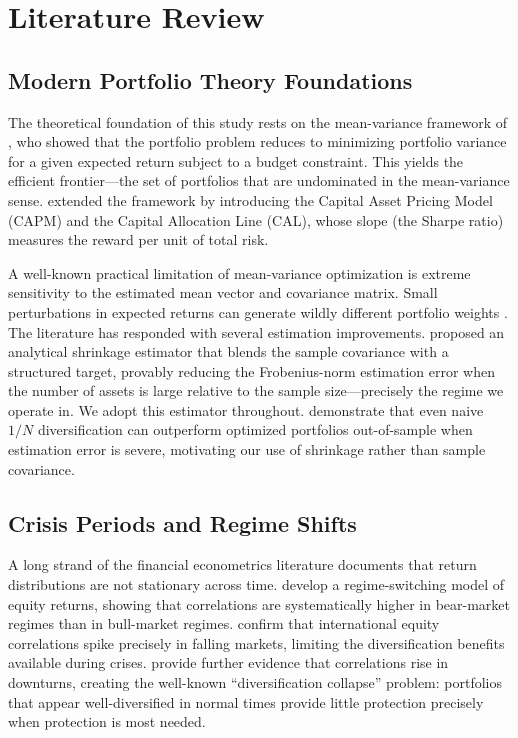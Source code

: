 \documentclass[12pt,a4paper]{article}
\begin{document}
\section{Literature Review}
\label{sec:lit}

\subsection{Modern Portfolio Theory Foundations}

The theoretical foundation of this study rests on the mean-variance framework of
\citet{Markowitz1952}, who showed that the portfolio problem reduces to minimizing
portfolio variance for a given expected return subject to a budget constraint. This
yields the efficient frontier---the set of portfolios that are undominated in the
mean-variance sense. \citet{Sharpe1964} extended the framework by introducing the
Capital Asset Pricing Model (CAPM) and the Capital Allocation Line (CAL), whose slope
(the Sharpe ratio) measures the reward per unit of total risk.

A well-known practical limitation of mean-variance optimization is extreme sensitivity
to the estimated mean vector and covariance matrix. Small perturbations in expected
returns can generate wildly different portfolio weights \citep{Chopra1993}. The
literature has responded with several estimation improvements. \citet{LedoitWolf2004}
proposed an analytical shrinkage estimator that blends the sample covariance with a
structured target, provably reducing the Frobenius-norm estimation error when the
number of assets is large relative to the sample size---precisely the regime we operate
in. We adopt this estimator throughout. \citet{DeMiguel2009} demonstrate that even
naive $1/N$ diversification can outperform optimized portfolios out-of-sample when
estimation error is severe, motivating our use of shrinkage rather than sample
covariance.

\subsection{Crisis Periods and Regime Shifts}

A long strand of the financial econometrics literature documents that return distributions
are not stationary across time. \citet{AngBekaert2002} develop a regime-switching model
of equity returns, showing that correlations are systematically higher in bear-market
regimes than in bull-market regimes. \citet{LonginSolnik2001} confirm that international
equity correlations spike precisely in falling markets, limiting the diversification
benefits available during crises. \citet{Campbell2002} provide further evidence that
correlations rise in downturns, creating the well-known ``diversification collapse''
problem: portfolios that appear well-diversified in normal times provide little protection
precisely when protection is most needed.
\end{document}
